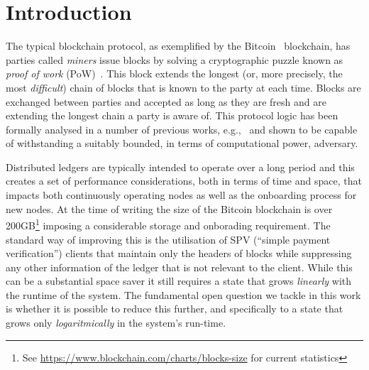\section{Introduction}


The typical blockchain protocol, as exemplified by the Bitcoin~\cite{bitcoin}
blockchain, has parties called \emph{miners} issue blocks by solving a cryptographic
puzzle known as \emph{proof of work} (PoW)~\cite{C:DwoNao92}. This block extends
the longest (or, more precisely, the most \emph{difficult}) chain of blocks that
is known to the party at each time. Blocks are exchanged between parties and
accepted as long as they are fresh and are extending the longest chain a party
is aware of. This protocol logic has been formally analysed in a number of
previous works,
e.g.,~\cite{EC:GarKiaLeo15,C:GarKiaLeo17,DBLP:conf/eurocrypt/PassSS17,DBLP:conf/crypto/BadertscherMTZ17}
and shown to be capable of withstanding a suitably bounded, in terms of
computational power, adversary.


Distributed ledgers are typically intended to operate over a long period
and this creates a set of performance considerations,
both in terms of time and space, that impacts both
continuously operating nodes as well as the onboarding process for new nodes.
At the time of writing the size of the Bitcoin blockchain is
over 200GB\footnote{See \url{https://www.blockchain.com/charts/blocks-size} for
current statistics} imposing a considerable storage and onborading requirement.
The standard way of improving this is the utilisation of SPV (``simple payment
verification'') clients that maintain only the headers of blocks
while suppressing any other information of the ledger that is not relevant to
the client. While this can be a substantial space saver it still requires a
state that grows {\em linearly} with the runtime of the system. The fundamental
open question we tackle in this work is whether it is possible to reduce this
further, and specifically to a state that grows only {\em logaritmically} in the
system's run-time.

